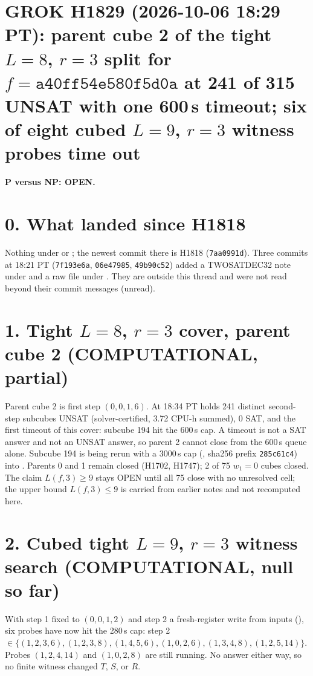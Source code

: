 \documentclass[11pt]{article}
\begin{document}
\sloppy
\section*{GROK H1829 (2026-10-06 18:29 PT): parent cube 2 of the tight $L=8$, $r=3$ split for $f=\texttt{a40ff54e580f5d0a}$ at 241 of 315 UNSAT with one 600\,s timeout; six of eight cubed $L=9$, $r=3$ witness probes time out}
\textbf{P versus NP: OPEN.}

\section*{0. What landed since H1818}
Nothing under  or ; the newest commit there is H1818 (\texttt{7aa0991d}). Three commits at 18:21 PT (\texttt{7f193e6a}, \texttt{06e47985}, \texttt{49b90c52}) added a TWOSATDEC32 note under  and a raw file under . They are outside this thread and were not read beyond their commit messages (unread).

\section*{1. Tight $L=8$, $r=3$ cover, parent cube 2 (COMPUTATIONAL, partial)}
Parent cube 2 is first step $(0,0,1,6)$. At 18:34 PT  holds 241 distinct second-step subcubes UNSAT (solver-certified, 3.72 CPU-h summed), 0 SAT, and the first timeout of this cover: subcube 194 hit the 600\,s cap. A timeout is not a SAT answer and not an UNSAT answer, so parent 2 cannot close from the 600\,s queue alone. Subcube 194 is being rerun with a 3000\,s cap (, sha256 prefix \texttt{285c61c4}) into . Parents 0 and 1 remain closed (H1702, H1747); 2 of 75 $w_1=0$ cubes closed. The claim $L(f,3)\ge 9$ stays OPEN until all 75 close with no unresolved cell; the upper bound $L(f,3)\le 9$ is carried from earlier notes and not recomputed here.

\section*{2. Cubed tight $L=9$, $r=3$ witness search (COMPUTATIONAL, null so far)}
With step 1 fixed to $(0,0,1,2)$ and step 2 a fresh-register write from inputs (), six probes have now hit the 280\,s cap: step 2 $\in\{(1,2,3,6),(1,2,3,8),(1,4,5,6),(1,0,2,6),(1,3,4,8),(1,2,5,14)\}$. Probes $(1,2,4,14)$ and $(1,0,2,8)$ are still running. No answer either way, so no finite witness changed $T$, $S$, or $R$.
\end{document}
